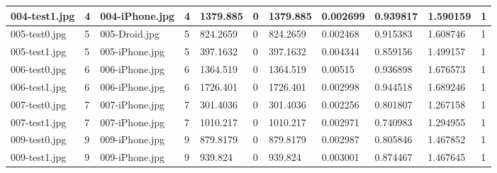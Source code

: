 \begin{landscape}
\begin{longtable}{|p{2cm}|p{1cm}|p{2cm}|p{1cm}|p{2cm}|p{1cm}|p{2cm}|p{2cm}|p{2cm}|p{2cm}|p{1cm}|}
		004-test1.jpg   & 4                & 004-iPhone.jpg        & 4                           & 1379.885              & 0                       & 1379.885                   & 0.002699              & 0.939817              & 1.590159                 & 1                \\ \hline
		005-test0.jpg   & 5                & 005-Droid.jpg         & 5                           & 824.2659              & 0                       & 824.2659                   & 0.002468              & 0.915383              & 1.608746                 & 1                \\ \hline
		005-test1.jpg   & 5                & 005-iPhone.jpg        & 5                           & 397.1632              & 0                       & 397.1632                   & 0.004344              & 0.859156              & 1.499157                 & 1                \\ \hline
		006-test0.jpg   & 6                & 006-iPhone.jpg        & 6                           & 1364.519              & 0                       & 1364.519                   & 0.00515               & 0.936898              & 1.676573                 & 1                \\ \hline
		006-test1.jpg   & 6                & 006-iPhone.jpg        & 6                           & 1726.401              & 0                       & 1726.401                   & 0.002998              & 0.944518              & 1.689246                 & 1                \\ \hline
		007-test0.jpg   & 7                & 007-iPhone.jpg        & 7                           & 301.4036              & 0                       & 301.4036                   & 0.002256              & 0.801807              & 1.267158                 & 1                \\ \hline
		007-test1.jpg   & 7                & 007-iPhone.jpg        & 7                           & 1010.217              & 0                       & 1010.217                   & 0.002971              & 0.740983              & 1.294955                 & 1                \\ \hline
		009-test0.jpg   & 9                & 009-iPhone.jpg        & 9                           & 879.8179              & 0                       & 879.8179                   & 0.002987              & 0.805846              & 1.467852                 & 1                \\ \hline
		009-test1.jpg   & 9                & 009-iPhone.jpg        & 9                           & 939.824               & 0                       & 939.824                    & 0.003001              & 0.874467              & 1.467645                 & 1                \\ \hline

\end{longtable}
\end{landscape}

